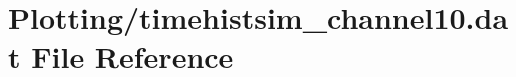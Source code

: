 \hypertarget{Plotting_2timehistsim__channel10_8dat}{}\section{Plotting/timehistsim\+\_\+channel10.dat File Reference}
\label{Plotting_2timehistsim__channel10_8dat}
